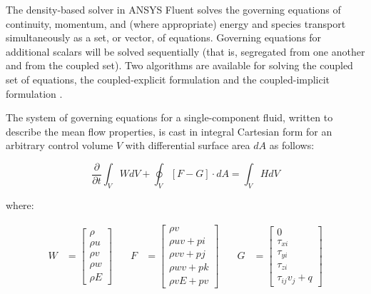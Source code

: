 The density-based solver in ANSYS Fluent solves the governing equations of continuity, momentum, and (where appropriate) energy and species transport simultaneously as a set, or vector, of equations. Governing equations for additional scalars will be solved sequentially (that is, segregated from one another and from the coupled set). Two algorithms are available for solving the coupled set of equations, the coupled-explicit formulation and the coupled-implicit formulation \citep{fluenttheory}.

The system of governing equations for a single-component fluid, written to describe the mean flow properties, is cast in integral Cartesian form for an arbitrary control volume $V$ with differential surface area $dA$ as follows:

\begin{equation} \label{eq:densitybased}
\frac{\partial}{\partial t} \int_V WdV + \oint_V \left[ F-G \right] \cdot dA = \int_V HdV
\end{equation}

\noindent where:

\begin{equation} \label{eq:desityvectors}
\begin{aligned}
	W &= \begin{bmatrix}
		\rho \\
		\rho u \\
		\rho v \\
		\rho w \\
		\rho E
	\end{bmatrix}
\end{aligned} \quad
\begin{aligned}
	F &= \begin{bmatrix}
		\rho v\\
		\rho uv + pi\\
		\rho vv + pj\\
		\rho wv + pk\\
		\rho vE + pv
	\end{bmatrix}
\end{aligned} \quad
\begin{aligned}
	G &= \begin{bmatrix}
		0 \\
		\tau_{xi} \\
		\tau_{yi} \\
		\tau_{zi} \\
		\tau_{ij} v_j + q
	\end{bmatrix}
\end{aligned}
\end{equation}

